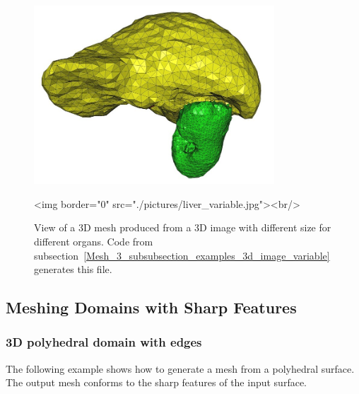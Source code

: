 \begin{figure}[ht]
\begin{center}
 \begin{ccTexOnly}
   \includegraphics[width=9cm]{Mesh_3/pictures/liver_variable}
 \end{ccTexOnly}
 \begin{ccHtmlOnly}
   <img border="0" src="./pictures/liver_variable.jpg"><br/>
 \end{ccHtmlOnly}
 \caption{View of a 3D mesh produced from a 3D image with different size for
 different organs. Code from
 subsection~\ref{Mesh_3_subsubsection_examples_3d_image_variable} generates this file.}
  \label{figure:liver_variable_mesh}
\end{center}
\end{figure}


\subsection{Meshing Domains with Sharp Features}
\label{Mesh_3_subsection_example_polyhedral_with_edges}

\subsubsection{3D polyhedral domain with edges }
The following example shows how to generate a mesh from a polyhedral
surface. The output mesh conforms to the sharp features of the input surface.


